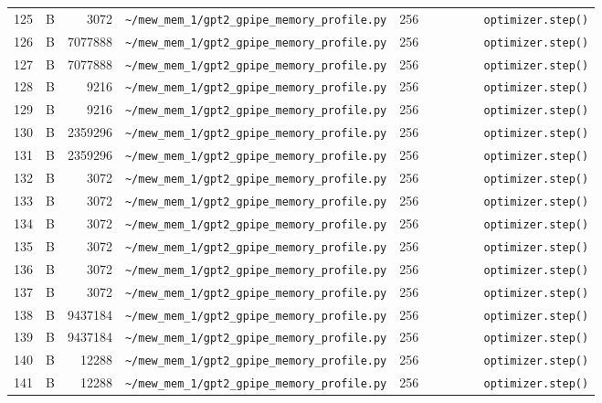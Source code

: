 \documentclass{article}
\begin{document}
\begin{longtable}{r l r p{6.5cm} r p{7.0cm}}
125 & B & 3072 & \lstinline|~/mew_mem_1/gpt2_gpipe_memory_profile.py| & 256 & \lstinline|        optimizer.step()| \\
126 & B & 7077888 & \lstinline|~/mew_mem_1/gpt2_gpipe_memory_profile.py| & 256 & \lstinline|        optimizer.step()| \\
127 & B & 7077888 & \lstinline|~/mew_mem_1/gpt2_gpipe_memory_profile.py| & 256 & \lstinline|        optimizer.step()| \\
128 & B & 9216 & \lstinline|~/mew_mem_1/gpt2_gpipe_memory_profile.py| & 256 & \lstinline|        optimizer.step()| \\
129 & B & 9216 & \lstinline|~/mew_mem_1/gpt2_gpipe_memory_profile.py| & 256 & \lstinline|        optimizer.step()| \\
130 & B & 2359296 & \lstinline|~/mew_mem_1/gpt2_gpipe_memory_profile.py| & 256 & \lstinline|        optimizer.step()| \\
131 & B & 2359296 & \lstinline|~/mew_mem_1/gpt2_gpipe_memory_profile.py| & 256 & \lstinline|        optimizer.step()| \\
132 & B & 3072 & \lstinline|~/mew_mem_1/gpt2_gpipe_memory_profile.py| & 256 & \lstinline|        optimizer.step()| \\
133 & B & 3072 & \lstinline|~/mew_mem_1/gpt2_gpipe_memory_profile.py| & 256 & \lstinline|        optimizer.step()| \\
134 & B & 3072 & \lstinline|~/mew_mem_1/gpt2_gpipe_memory_profile.py| & 256 & \lstinline|        optimizer.step()| \\
135 & B & 3072 & \lstinline|~/mew_mem_1/gpt2_gpipe_memory_profile.py| & 256 & \lstinline|        optimizer.step()| \\
136 & B & 3072 & \lstinline|~/mew_mem_1/gpt2_gpipe_memory_profile.py| & 256 & \lstinline|        optimizer.step()| \\
137 & B & 3072 & \lstinline|~/mew_mem_1/gpt2_gpipe_memory_profile.py| & 256 & \lstinline|        optimizer.step()| \\
138 & B & 9437184 & \lstinline|~/mew_mem_1/gpt2_gpipe_memory_profile.py| & 256 & \lstinline|        optimizer.step()| \\
139 & B & 9437184 & \lstinline|~/mew_mem_1/gpt2_gpipe_memory_profile.py| & 256 & \lstinline|        optimizer.step()| \\
140 & B & 12288 & \lstinline|~/mew_mem_1/gpt2_gpipe_memory_profile.py| & 256 & \lstinline|        optimizer.step()| \\
141 & B & 12288 & \lstinline|~/mew_mem_1/gpt2_gpipe_memory_profile.py| & 256 & \lstinline|        optimizer.step()| \\

\end{longtable}
\end{document}
